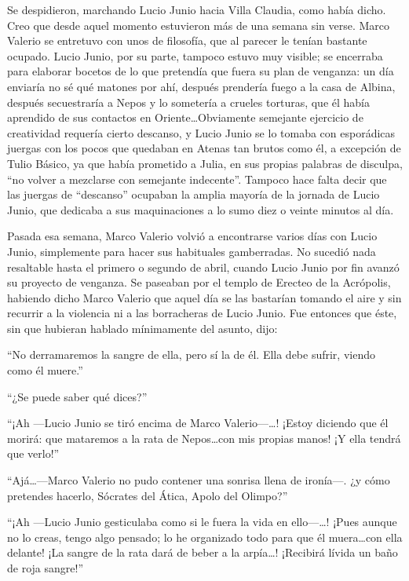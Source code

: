 \documentclass[11pt,openany]{book}
\begin{document}
Se despidieron, marchando Lucio Junio hacia Villa Claudia, como había dicho. Creo que desde aquel momento estuvieron más de una semana sin verse. Marco Valerio se entretuvo con unos de filosofía, que al parecer le tenían bastante ocupado. Lucio Junio, por su parte, tampoco estuvo muy visible; se encerraba para elaborar bocetos de lo que pretendía que fuera su plan de venganza: un día enviaría no sé qué matones por ahí, después prendería fuego a la casa de Albina, después secuestraría a Nepos y lo sometería a crueles torturas, que él había aprendido de sus contactos en Oriente\dots Obviamente semejante ejercicio de creatividad requería cierto descanso, y Lucio Junio se lo tomaba con esporádicas juergas con los pocos que quedaban en Atenas tan brutos como él, a excepción de Tulio Básico, ya que había prometido a Julia, en sus propias palabras de disculpa, “no volver a mezclarse con semejante indecente”. Tampoco hace falta decir que las juergas de “descanso” ocupaban la amplia mayoría de la jornada de Lucio Junio, que dedicaba a sus maquinaciones a lo sumo diez o veinte minutos al día. 

Pasada esa semana, Marco Valerio volvió a encontrarse varios días con Lucio Junio, simplemente para hacer sus habituales gamberradas. No sucedió nada resaltable hasta el primero o segundo de abril, cuando Lucio Junio por fin avanzó su proyecto de venganza. Se paseaban por el templo de Erecteo de la Acrópolis, habiendo dicho Marco Valerio que aquel día se las bastarían tomando el aire y sin recurrir a la violencia ni a las borracheras de Lucio Junio. Fue entonces que éste, sin que hubieran hablado mínimamente del asunto, dijo: 

“No derramaremos la sangre de ella, pero sí la de él. Ella debe sufrir, viendo como él muere.” 

“¿Se puede saber qué dices?” 

“¡Ah —Lucio Junio se tiró encima de Marco Valerio—\dots! ¡Estoy diciendo que él morirá: que mataremos a la rata de Nepos\dots con mis propias manos! ¡Y ella tendrá que verlo!” 

“Ajá\dots —Marco Valerio no pudo contener una sonrisa llena de ironía—. ¿y cómo pretendes hacerlo, Sócrates del Ática, Apolo del Olimpo?” 

“¡Ah —Lucio Junio gesticulaba como si le fuera la vida en ello—\dots! ¡Pues aunque no lo creas, tengo algo pensado; lo he organizado todo para que él muera\dots con ella delante! ¡La sangre de la rata dará de beber a la arpía\dots! ¡Recibirá lívida un baño de roja sangre!” 
\end{document}

